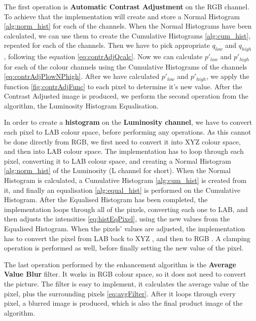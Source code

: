 \documentclass[journal,transmag]{IEEEtran}
\begin{document}
The first operation is \textbf{Automatic Contrast Adjustment} on the RGB channel. To achieve that the implementation will create and store a Normal Histogram \ref{alg:norm_hist} for each of the channels. When the Normal Histograms have been calculated, we can use them to create the Cumulative Histograms \ref{alg:cum_hist}, repeated for each of the channels. Then we have to pick appropriate $q_{low}$ and $q_{high}$, following the equation \ref{eq:contrAdjQcalc}. Now we can calculate $p'_{low}$ and $p'_{high}$ for each of the colour channels using the Cumulative Histograms of the channels \ref{eq:contrAdjPlowNPhigh}. After we have calculated $p'_{low}$ and $p'_{high}$, we apply the function \ref{fig:contrAdjFunc} to each pixel to determine it's new value. After the Contrast Adjusted image is produced, we perform the second operation from the algorithm, the Luminosity Histogram Equalisation.

In order to create a \textbf{histogram} on the \textbf{Luminosity channel}, we have to convert each pixel to LAB colour space, before performing any operations. As this cannot be done directly from RGB, we first need to convert it into XYZ \cite{rgbTOxyz} colour space, and then into LAB \cite{xyzTOlab} colour space. The implementation has to loop through each pixel, converting it to LAB colour space, and creating a Normal Histogram \ref{alg:norm_hist} of the Luminosity (L channel for short). When the Normal Histogram is calculated, a Cumulative Histogram \ref{alg:cum_hist} is created from it, and finally an equalisation \ref{alg:equal_hist} is performed on the Cumulative Histogram. After the Equalised Histogram has been completed, the implementation loops through all of the pixels, converting each one to LAB, and then adjusts the intensities \ref{eq:histEqPixel}, using the new values from the Equalised Histogram. When the pixels' values are adjusted, the implementation has to convert the pixel from LAB back to XYZ \cite{labTOxyz}, and then to RGB \cite{xyzTOrgb}. A clamping operation is performed as well, before finally setting the new value of the pixel.

The last operation performed by the enhancement algorithm is the \textbf{Average Value Blur} filter. It works in RGB colour space, so it does not need to convert the picture. The filter is easy to implement, it calculates the average value of the pixel, plus the surrounding pixels \ref{eq:avgFilter}. After it loops through every pixel, a blurred image is produced, which is also the final product image of the algorithm.
\end{document}
